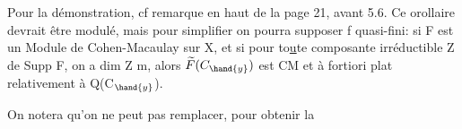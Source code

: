 Pour la démonstration, cf remarque en haut de la page 21, avant 5.6.
Ce orollaire devrait être modulé, mais pour simplifier on pourra
supposer f quasi-fini: si F est un Module de Cohen-Macaulay sur X, et si
pour to\uline{u}te composante irréductible Z de Supp F, on a dim Z \over{>}{$\geqslant$} m, alors
$\widetilde{F}(C_{\hand{y}})$ est CM \hand{(}et à fortiori plat\hand{)} relativement à Q(C$_{\hand{y}}$).

On notera qu'on ne peut pas remplacer, pour obtenir la

